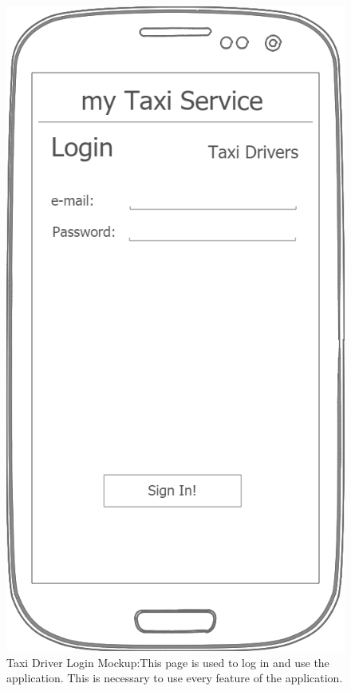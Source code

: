 \documentclass[a4paper]{article}
\begin{document}
\begin{figure}[H]
\includegraphics[width=\mockupWidth]{Mockup-TaxiDriversLogin}
\centering
\caption[Taxi Driver Login Mockup]{Taxi Driver Login Mockup:\newline This page is used to log in and use the application. This is necessary to use every feature of the application.}
\label{fig:mockuptaxidriverlogin}
\end{figure}
\end{document}
